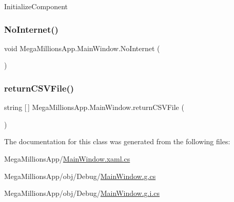 Initialize\+Component 

\mbox{\label{class_mega_millions_app_1_1_main_window_af6204da9365bd08d3e308482e41670db}} 
\subsubsection{\texorpdfstring{No\+Internet()}{NoInternet()}}
{\footnotesize\ttfamily void Mega\+Millions\+App.\+Main\+Window.\+No\+Internet (\begin{DoxyParamCaption}{ }\end{DoxyParamCaption})}

\mbox{\label{class_mega_millions_app_1_1_main_window_a78484547e4d9c4fcdba16561fdcdedaf}} 
\subsubsection{\texorpdfstring{return\+C\+S\+V\+File()}{returnCSVFile()}}
{\footnotesize\ttfamily string \mbox{[}$\,$\mbox{]} Mega\+Millions\+App.\+Main\+Window.\+return\+C\+S\+V\+File (\begin{DoxyParamCaption}{ }\end{DoxyParamCaption})}



The documentation for this class was generated from the following files\+:\begin{DoxyCompactItemize}
\item 
Mega\+Millions\+App/\hyperlink{_main_window_8xaml_8cs}{Main\+Window.\+xaml.\+cs}\item 
Mega\+Millions\+App/obj/\+Debug/\hyperlink{_debug_2_main_window_8g_8cs}{Main\+Window.\+g.\+cs}\item 
Mega\+Millions\+App/obj/\+Debug/\hyperlink{_debug_2_main_window_8g_8i_8cs}{Main\+Window.\+g.\+i.\+cs}\end{DoxyCompactItemize}
